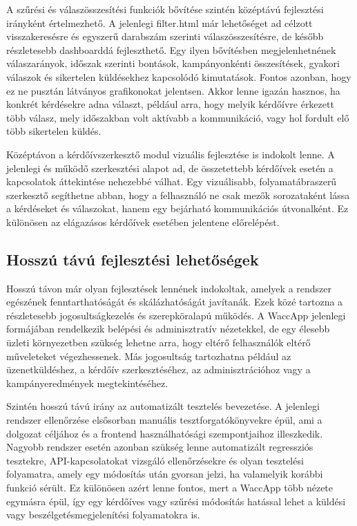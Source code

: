 A szűrési és válaszösszesítési funkciók bővítése szintén középtávú fejlesztési irányként értelmezhető. A jelenlegi filter.html már lehetőséget ad célzott visszakeresésre és egyszerű darabszám szerinti válaszösszesítésre, de később részletesebb dashboarddá fejleszthető. Egy ilyen bővítésben megjelenhetnének válaszarányok, időszak szerinti bontások, kampányonkénti összesítések, gyakori válaszok és sikertelen küldésekhez kapcsolódó kimutatások. Fontos azonban, hogy ez ne pusztán látványos grafikonokat jelentsen. Akkor lenne igazán hasznos, ha konkrét kérdésekre adna választ, például arra, hogy melyik kérdőívre érkezett több válasz, mely időszakban volt aktívabb a kommunikáció, vagy hol fordult elő több sikertelen küldés.

Középtávon a kérdőívszerkesztő modul vizuális fejlesztése is indokolt lenne. A jelenlegi  és  működő szerkesztési alapot ad, de összetettebb kérdőívek esetén a kapcsolatok áttekintése nehezebbé válhat. Egy vizuálisabb, folyamatábraszerű szerkesztő segíthetne abban, hogy a felhasználó ne csak mezők sorozataként lássa a kérdéseket és válaszokat, hanem egy bejárható kommunikációs útvonalként. Ez különösen az elágazásos kérdőívek esetében jelentene előrelépést.

\subsection{Hosszú távú fejlesztési lehetőségek}

Hosszú távon már olyan fejlesztések lennének indokoltak, amelyek a rendszer egészének fenntarthatóságát és skálázhatóságát javítanák. Ezek közé tartozna a részletesebb jogosultságkezelés és szerepköralapú működés. A WaccApp jelenlegi formájában rendelkezik belépési és adminisztratív nézetekkel, de egy élesebb üzleti környezetben szükség lehetne arra, hogy eltérő felhasználók eltérő műveleteket végezhessenek. Más jogosultság tartozhatna például az üzenetküldéshez, a kérdőív szerkesztéséhez, az adminisztrációhoz vagy a kampányeredmények megtekintéséhez.

Szintén hosszú távú irány az automatizált tesztelés bevezetése. A jelenlegi rendszer ellenőrzése elsősorban manuális tesztforgatókönyvekre épül, ami a dolgozat céljához és a frontend használhatósági szempontjaihoz illeszkedik. Nagyobb rendszer esetén azonban szükség lenne automatizált regressziós tesztekre, API-kapcsolatokat vizsgáló ellenőrzésekre és olyan tesztelési folyamatra, amely egy módosítás után gyorsan jelzi, ha valamelyik korábbi funkció sérült. Ez különösen azért lenne fontos, mert a WaccApp több nézete egymásra épül, így egy kérdőíves vagy szűrési módosítás hatással lehet a küldési vagy beszélgetésmegjelenítési folyamatokra is.

